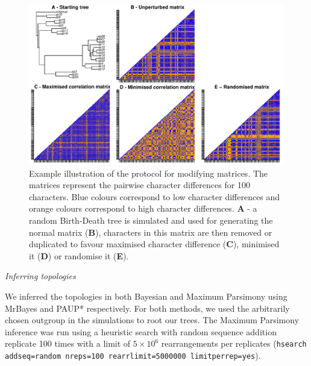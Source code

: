 \documentclass[12pt,letterpaper]{article}
\renewcommand{\subsection}[1]{%
\bigskip
\begin{center}
\begin{large}
\normalfont\itshape #1
\end{large}
\end{center}}
\begin{document}
\begin{figure}[!htbp]
\centering
   \includegraphics[width=1\textwidth]{Figures/Modif_matrix.pdf}
\caption{Example illustration of the protocol for modifying matrices. The matrices represent the pairwise character differences for 100 characters. Blue colours correspond to low character differences and orange colours correspond to high character differences. \textbf{A} - a random Birth-Death tree is simulated and used for generating the normal matrix (\textbf{B}), characters in this matrix are then removed or duplicated to favour maximised character difference (\textbf{C}), minimised it (\textbf{D}) or randomise it (\textbf{E}).}
\label{Fig:modif_matrix}
\end{figure}

\subsection{Inferring topologies}
We inferred the topologies in both Bayesian and Maximum Parsimony using MrBayes \citep[v3.2.6;][]{Ronquist2012mrbayes} and PAUP* \citep[v4.0a151;][]{swofford2001paup} respectively.
For both methods, we used the arbitrarily chosen outgroup in the simulations to root our trees.
The Maximum Parsimony inference was run using a heuristic search with random sequence addition replicate 100 times with a limit of $5\times10^6$ rearrangements per replicates (\texttt{hsearch addseq=random nreps=100 rearrlimit=5000000 limitperrep=yes}).
\end{document}
